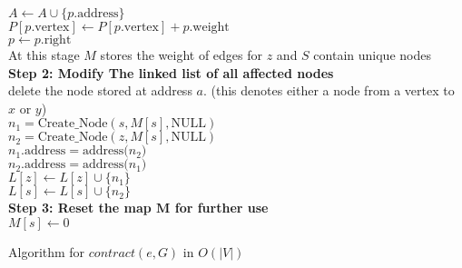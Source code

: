 \documentclass[a4paper]{article}
\begin{document}
\begin{algorithm}[H]
{{    }
    $A \leftarrow A \cup \{ p.\text{address} \}$ \\
    $P[p.\text{vertex}] \leftarrow P[p.\text{vertex}] + p.\text{weight}$ \\
    $p \leftarrow p.\text{right}$ \\
  }
  At this stage $M$ stores the weight of edges for $z$ and $S$ contain unique nodes \\
  \textbf{Step 2: Modify The linked list of all affected nodes} \\
   {
    delete the node stored at address $a$. (this denotes either a node from a vertex to $x$ or $y$) \\
  }
   {
    $n_1 = \text{Create\_Node}(s, M[s], \text{NULL})$ \\
    $n_2 = \text{Create\_Node}(z, M[s], \text{NULL})$ \\
    $n_1.\text{address} = \text{address($n_2$)}$ \\
    $n_2.\text{address} = \text{address($n_1$)}$ \\
    $L[z] \leftarrow L[z] \cup \{ n_1 \}$ \\
    $L[s] \leftarrow L[s] \cup \{ n_2 \}$ \\
  }
  \textbf{Step 3: Reset the map $\mathbf{M}$ for further use} \\
   {
    $M[s] \leftarrow 0$ \\ 
  }
 \caption{Algorithm for $contract(e, G)$ in $O(|V|)$}
\end{algorithm}

\pagebreak
\end{document}
